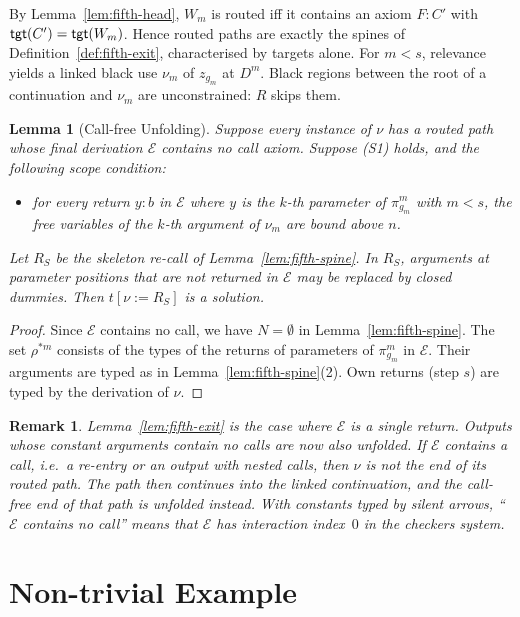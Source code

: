 \documentclass[10pt,a4paper]{article}
\theoremstyle{plain}%
\newtheorem{lemma}[theorem]{Lemma}
\newtheorem{remark}[theorem]{Remark}
\begin{document}
By Lemma~\ref{lem:fifth-head}, $W_m$ is routed iff it contains an axiom $F : C'$ with $\mathsf{tgt}(C') = \mathsf{tgt}(W_m)$.
Hence routed paths are exactly the spines of Definition~\ref{def:fifth-exit}, characterised by targets alone.
For $m < s$, relevance yields a linked black use $\nu_m$ of $z_{g_m}$ at $D^m$.
Black regions between the root of a continuation and $\nu_m$ are unconstrained: $R$ skips them.

\begin{lemma}[Call-free Unfolding]\label{lem:fifth-callfree}
Suppose every instance of $\nu$ has a routed path whose final derivation $\mathcal{E}$ contains no call axiom.
Suppose (S1) holds, and the following scope condition:
\begin{itemize}
\item[(S2')] for every return $y : b$ in $\mathcal{E}$ where $y$ is the $k$-th parameter of $\pi^m_{g_m}$ with $m < s$, the free variables of the $k$-th argument of $\nu_m$ are bound above $n$.
\end{itemize}
Let $R_S$ be the skeleton re-call of Lemma~\ref{lem:fifth-spine}.
In $R_S$, arguments at parameter positions that are not returned in $\mathcal{E}$ may be replaced by closed dummies.
Then $t[\nu := R_S]$ is a solution.
\end{lemma}

\begin{proof}
Since $\mathcal{E}$ contains no call, we have $N = \emptyset$ in Lemma~\ref{lem:fifth-spine}.
The set $\rho^{*m}$ consists of the types of the returns of parameters of $\pi^m_{g_m}$ in $\mathcal{E}$.
Their arguments are typed as in Lemma~\ref{lem:fifth-spine}(2).
Own returns (step $s$) are typed by the derivation of $\nu$.
\end{proof}

\begin{remark}
Lemma~\ref{lem:fifth-exit} is the case where $\mathcal{E}$ is a single return.
Outputs whose constant arguments contain no calls are now also unfolded.
If $\mathcal{E}$ contains a call, i.e.\ a re-entry or an output with nested calls, then $\nu$ is not the end of its routed path.
The path then continues into the linked continuation, and the call-free end of that path is unfolded instead.
With constants typed by silent arrows, ``$\mathcal{E}$ contains no call'' means that $\mathcal{E}$ has interaction index~$0$ in the checkers system.
\end{remark}

\newpage

\section{Non-trivial Example}
\end{document}
